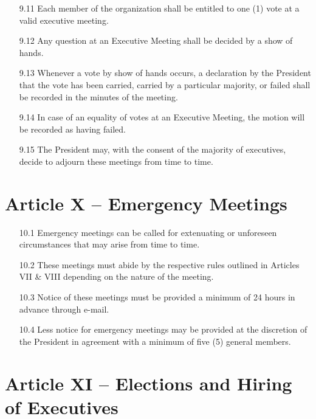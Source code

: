 \documentclass[12pt,a4paper]{article}
\begin{document}
\begin{enumerate}
\item[9.11] Each member of the organization shall be entitled to one (1) vote at a valid executive meeting.

\item[9.12] Any question at an Executive Meeting shall be decided by a show of hands.

\item[9.13] Whenever a vote by show of hands occurs, a declaration by the President that the vote has been carried, carried by a particular majority, or failed shall be recorded in the minutes of the meeting.

\item[9.14] In case of an equality of votes at an Executive Meeting, the motion will be recorded as having failed.

\item[9.15] The President may, with the consent of the majority of executives, decide to adjourn these meetings from time to time.
\end{enumerate}

\section*{Article X – Emergency Meetings}

\begin{enumerate}
\item[10.1] Emergency meetings can be called for extenuating or unforeseen circumstances that may arise from time to time.

\item[10.2] These meetings must abide by the respective rules outlined in Articles VII \& VIII depending on the nature of the meeting.

\item[10.3] Notice of these meetings must be provided a minimum of 24 hours in advance through e-mail.

\item[10.4] Less notice for emergency meetings may be provided at the discretion of the President in agreement with a minimum of five (5) general members.
\end{enumerate}

\section*{Article XI – Elections and Hiring of Executives}
\end{document}
